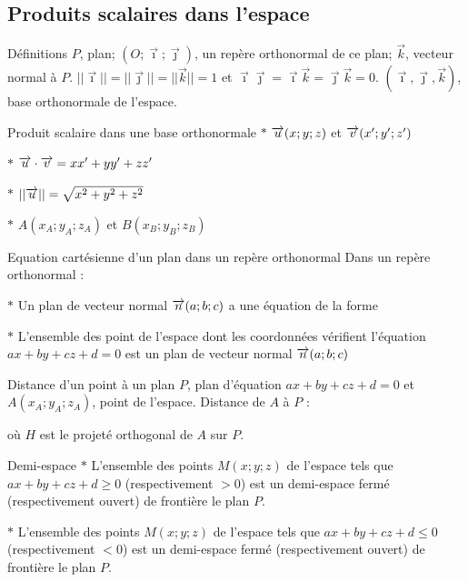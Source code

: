 \medskip


\subsection{Produits scalaires dans l'espace}
\begin{bclogo}{Définitions}
$P$, plan; $(O;\vec{\imath};\vec{\jmath})$, un repère orthonormal de ce plan; $\vec{k}$, vecteur normal à $P$. $||\vec{\imath}||=||\vec{\jmath}||=||\vec{k}||=1$ et $\vec{\imath}\vec{\jmath}=\vec{\imath}\vec{k}=\vec{\jmath}\vec{k}=0$. $(\vec{\imath},\vec{\jmath},\vec{k})$, base orthonormale de l'espace.
\end{bclogo}

\medskip

\begin{bclogo}{Produit scalaire dans une base orthonormale}
$\ast$ $\overrightarrow{u} (x;y;z)$ et $\overrightarrow{v}(x';y';z')$

$\ast$ $\overrightarrow{u}\cdot \overrightarrow{v}=xx'+yy'+zz'$

$\ast$ $||\overrightarrow{u}||=\sqrt{x^2+y^2+z^2}$

$\ast$ $A(x_A;y_A;z_A)$ et $B(x_B;y_B;z_B)$

\end{bclogo}


\medskip

\begin{bclogo}{Equation cartésienne d'un plan dans un repère orthonormal}
Dans un repère orthonormal :

$\ast$ Un plan de vecteur normal $\overrightarrow{n}(a;b;c)$ a une équation de la forme 

$\ast$ L'ensemble des point de l'espace  dont les coordonnées vérifient l'équation $ax+by+cz+d=0$ est un plan de vecteur normal $\overrightarrow{n}(a;b;c)$ 
\end{bclogo}

\medskip

\begin{bclogo}{Distance d'un point à un plan}
$P$, plan d'équation $ax+by+cz+d=0$ et $A(x_A;y_A;z_A)$, point de l'espace. Distance de $A$ à $P$ : 

 où $H$ est le projeté orthogonal de $A$ sur $P$.
\end{bclogo}

\medskip

\begin{bclogo}{Demi-espace}
$\ast$ L'ensemble des points $M(x;y;z)$ de l'espace tels que $ax+by+cz+d\geqslant 0$ (respectivement $>0$) est un demi-espace fermé (respectivement ouvert) de frontière le plan $P$.

$\ast$ L'ensemble des points $M(x;y;z)$ de l'espace tels que $ax+by+cz+d\leqslant 0$ (respectivement $<0$) est un demi-espace fermé (respectivement ouvert) de frontière le plan $P$.
\end{bclogo}


